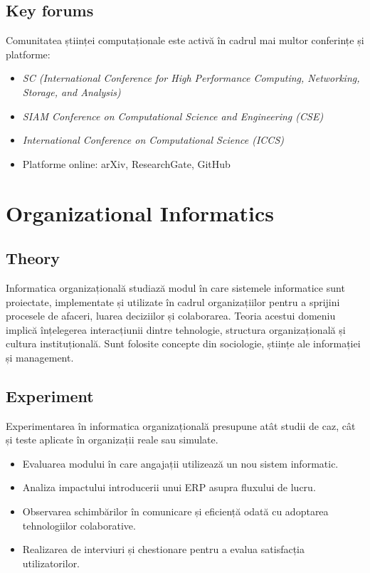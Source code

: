 \documentclass[12pt, letterpaper]{article}
\begin{document}
\subsection*{Key forums}
Comunitatea științei computaționale este activă în cadrul mai multor conferințe și platforme:
\begin{itemize}
    \item \textit{SC (International Conference for High Performance Computing, Networking, Storage, and Analysis)}
    \item \textit{SIAM Conference on Computational Science and Engineering (CSE)}
    \item \textit{International Conference on Computational Science (ICCS)}
    \item Platforme online: arXiv, ResearchGate, GitHub
\end{itemize}


\newpage
\section{Organizational Informatics}

\subsection*{Theory}
Informatica organizațională studiază modul în care sistemele informatice sunt proiectate, implementate și utilizate în cadrul organizațiilor pentru a sprijini procesele de afaceri, luarea deciziilor și colaborarea. Teoria acestui domeniu implică înțelegerea interacțiunii dintre tehnologie, structura organizațională și cultura instituțională. Sunt folosite concepte din sociologie, științe ale informației și management.

\subsection*{Experiment}
Experimentarea în informatica organizațională presupune atât studii de caz, cât și teste aplicate în organizații reale sau simulate.
\begin{itemize}
    \item Evaluarea modului în care angajații utilizează un nou sistem informatic.
    \item Analiza impactului introducerii unui ERP asupra fluxului de lucru.
    \item Observarea schimbărilor în comunicare și eficiență odată cu adoptarea tehnologiilor colaborative.
    \item Realizarea de interviuri și chestionare pentru a evalua satisfacția utilizatorilor.
\end{itemize}
\end{document}

